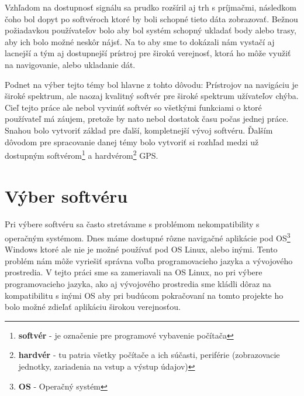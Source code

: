 Vzhľadom na dostupnosť signálu sa prudko rozšíril aj trh s príjmačmi, následkom čoho bol dopyt po softvéroch ktoré by boli schopné tieto dáta zobrazovať. Bežnou požiadavkou používateľov bolo aby bol systém schopný ukladať body alebo trasy, aby ich bolo možné neskôr nájsť. Na to aby sme to dokázali nám vystačí aj lacnejší a tým aj dostupnejší prístroj pre širokú verejnosť, ktorá ho môže využiť na navigovanie, alebo ukladanie dát.

Podnet na výber tejto témy bol hlavne z tohto dôvodu: Prístrojov na navigáciu je široké spektrum, ale naozaj kvalitný softvér pre široké spektrum užívateľov chýba. Cieľ tejto práce ale nebol vyvinúť softvér so všetkými funkciami o ktoré používateľ má záujem, pretože by nato nebol dostatok času počas jednej práce. Snahou bolo vytvoriť základ pre ďalší, kompletnejší vývoj softvéru.
Ďalším dôvodom pre spracovanie danej témy bolo vytvoriť si rozhľad medzi už dostupným softvérom\footnote{\textbf{softvér} - je označenie pre programové vybavenie počítača} a hardvérom\footnote{\textbf{hardvér} - tu patria všetky počítače a ich súčasti, periférie (zobrazovacie jednotky, zariadenia na vstup a výstup údajov)} GPS.

\section*{Výber softvéru}
\paragraph{}
Pri výbere softvéru sa často stretávame s problémom nekompatibility s
operačným systémom. Dnes máme dostupné rôzne navigačné aplikácie pod OS\footnote{\textbf{OS} - Operačný systém} Windows
ktoré ale nie je možné používať pod OS Linux, alebo inými. Tento problém nám môže vyriešiť
správna voľba programovacieho jazyka a vývojového prostredia. 
V tejto práci sme sa zameriavali na OS Linux, no pri výbere programovacieho
jazyka, ako aj vývojového prostredia sme kládli dôraz na kompatibilitu s inými
OS aby pri budúcom pokračovaní na tomto projekte ho bolo možné zdieľať aplikáciu širokou verejnosťou. 

